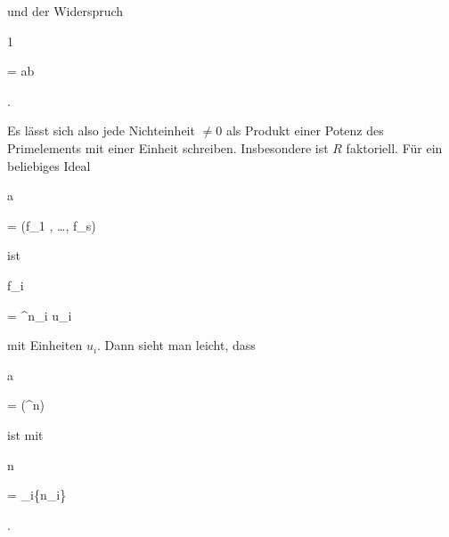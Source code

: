 {{{   }{
}

}
{}{}{}
und der Widerspruch


\mavergleichskette

{\vergleichskette

{ 1
}

{ = }{ ab \pi
}

{  }{
}

{    }{
}

{   }{
}

}
{}{}{.}


Es lässt sich also jede Nichteinheit $\neq 0$ als Produkt einer Potenz des Primelements mit einer Einheit schreiben. Insbesondere ist $R$ faktoriell. Für ein beliebiges Ideal


\mavergleichskette

{\vergleichskette

{ {\mathfrak a}
}

{ = }{ (f_1 , \ldots , f_s)
}

{  }{
}

{    }{
}

{   }{
}

}
{}{}{}
ist


\mavergleichskette

{\vergleichskette

{ f_i
}

{ = }{ \pi^{n_i } u_i
}

{  }{
}

{    }{
}

{   }{
}

}
{}{}{}
mit Einheiten $u_i$. Dann sieht man leicht, dass


\mavergleichskette

{\vergleichskette

{ {\mathfrak a}
}

{ = }{ (\pi^n)
}

{  }{
}

{    }{
}

{   }{
}

}
{}{}{}
ist mit


\mavergleichskette

{\vergleichskette

{n
}

{ = }{ \min_{i}\{n_i\}
}

{  }{
}

{    }{
}

{   }{
}

}
{}{}{.}


}


